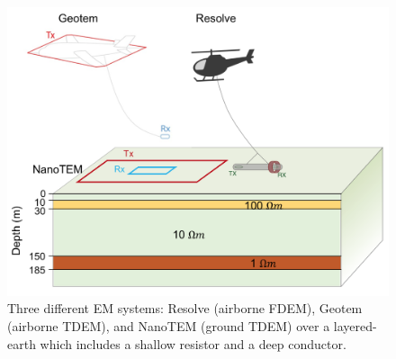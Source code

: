 \begin{figure}
    \begin{center}
    \includegraphics[width=0.8\columnwidth]{figures/joint-setup.png}
    \end{center}
\caption{
    Three different EM systems: Resolve (airborne FDEM), Geotem (airborne TDEM), and NanoTEM (ground TDEM) over a layered-earth which includes a shallow resistor and a deep conductor.
}
\label{fig:joint-setup}
\end{figure}

